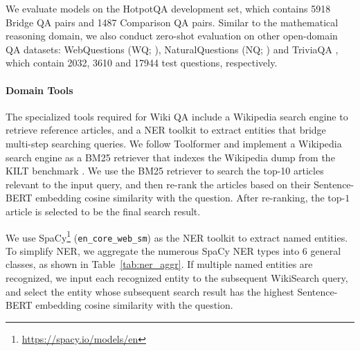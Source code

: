 We evaluate models on the HotpotQA development set, which contains 5918 Bridge QA pairs and 1487 Comparison QA pairs. Similar to the mathematical reasoning domain, we also conduct zero-shot evaluation on other open-domain QA datasets: WebQuestions (WQ; \citealp{berant2013semantic}), NaturalQuestions (NQ; \citealp{kwiatkowski2019natural}) and TriviaQA \citep{joshi2017triviaqa}, which contain 2032, 3610 and 17944 test questions, respectively.

\paragraph{Domain Tools}
The specialized tools required for Wiki QA include a Wikipedia search engine to retrieve reference articles, and a NER toolkit to extract entities that bridge multi-step searching queries.
We follow Toolformer \citep{schick2023toolformer} and implement a Wikipedia search engine as a BM25 retriever \citep{robertson1995okapi,baeza1999modern} that indexes the Wikipedia dump from the KILT benchmark \citep{petroni2021kilt}.
We use the BM25 retriever to search the top-10 articles relevant to the input query, and then re-rank the articles based on their Sentence-BERT \citep{reimers2019sentence} embedding cosine similarity with the question.
After re-ranking, the top-$1$ article is selected to be the final search result.

We use SpaCy\footnote{\url{https://spacy.io/models/en}} (\texttt{en\_core\_web\_sm}) as the NER toolkit to extract named entities.
To simplify NER, we aggregate the numerous SpaCy NER types into 6 general classes, as shown in Table~\ref{tab:ner_aggr}.
If multiple named entities are recognized, we input each recognized entity to the subsequent WikiSearch query, and select the entity whose subsequent search result has the highest Sentence-BERT embedding cosine similarity with the question.

\begin{table}[t]
\centering
{}
\caption{Aggregation of SpaCy NER types.}
\label{tab:ner_aggr}
\end{table}

